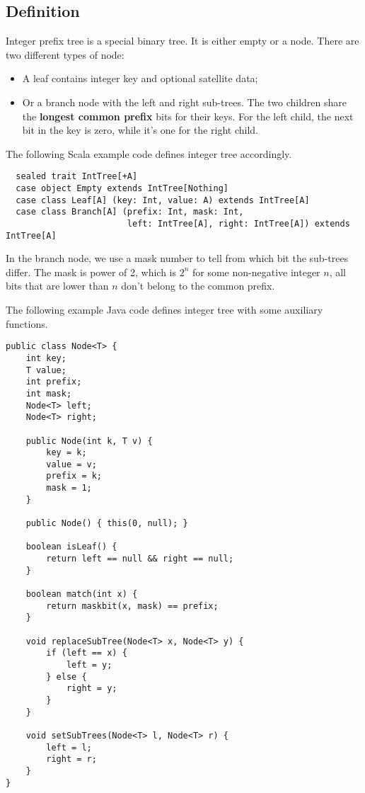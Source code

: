 \documentclass{article}
\begin{document}
\subsection{Definition}

Integer prefix tree is a special binary tree. It is either
empty or a node. There are two different types of node:

\begin{itemize}
\item A leaf contains integer key and optional satellite data;
\item Or a branch node with the left and right sub-trees. The
two children share the \textbf{longest common prefix} bits for their keys.
For the left child, the next bit in the key is zero, while it's one
for the right child.
\end{itemize}

The following Scala example code defines integer tree accordingly.

\lstset{language=Scala}
\begin{lstlisting}
  sealed trait IntTree[+A]
  case object Empty extends IntTree[Nothing]
  case class Leaf[A] (key: Int, value: A) extends IntTree[A]
  case class Branch[A] (prefix: Int, mask: Int,
                        left: IntTree[A], right: IntTree[A]) extends IntTree[A]
\end{lstlisting}

In the branch node, we use a mask number to tell from which bit the sub-trees differ.
The mask is power of 2, which is $2^n$ for some non-negative integer $n$, all
bits that are lower than $n$ don't belong to the common prefix.

The following example Java code defines integer tree with some auxiliary functions.

\lstset{language=Java}
\begin{lstlisting}
public class Node<T> {
    int key;
    T value;
    int prefix;
    int mask;
    Node<T> left;
    Node<T> right;

    public Node(int k, T v) {
        key = k;
        value = v;
        prefix = k;
        mask = 1;
    }

    public Node() { this(0, null); }

    boolean isLeaf() {
        return left == null && right == null;
    }

    boolean match(int x) {
        return maskbit(x, mask) == prefix;
    }

    void replaceSubTree(Node<T> x, Node<T> y) {
        if (left == x) {
            left = y;
        } else {
            right = y;
        }
    }

    void setSubTrees(Node<T> l, Node<T> r) {
        left = l;
        right = r;
    }
}
\end{lstlisting}
\end{document}
